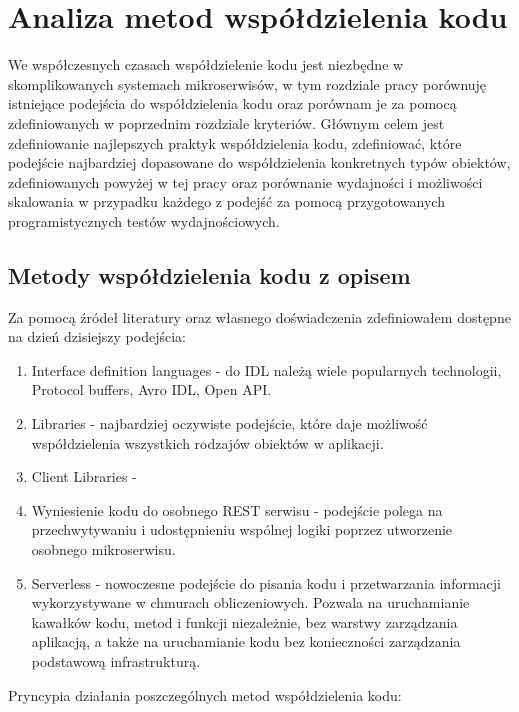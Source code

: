 \documentclass[runningheads,12pt]{llncs}
\begin{document}
\newpage

\section{Analiza metod współdzielenia kodu}

We współczesnych czasach współdzielenie kodu jest niezbędne w skomplikowanych systemach mikroserwisów, w tym rozdziale pracy porównuję istniejące podejścia do współdzielenia kodu oraz porównam je za pomocą zdefiniowanych w poprzednim rozdziale kryteriów. Głównym celem jest zdefiniowanie najlepszych praktyk współdzielenia kodu, zdefiniować, które podejście najbardziej dopasowane do współdzielenia konkretnych typów obiektów, zdefiniowanych powyżej w tej pracy oraz porównanie wydajności i możliwości skalowania w przypadku każdego z podejść za pomocą przygotowanych programistycznych testów wydajnościowych.

\subsection{Metody współdzielenia kodu z opisem}

Za pomocą źródeł literatury oraz własnego doświadczenia zdefiniowałem dostępne na dzień dzisiejszy podejścia:

\begin{enumerate}
    \item Interface definition languages - do IDL należą wiele popularnych technologii, Protocol buffers, Avro IDL, Open API. ~\cite{wiki:interface_description_language}
    \item Libraries - najbardziej oczywiste podejście, które daje możliwość współdzielenia wszystkich rodzajów obiektów w aplikacji.
    \item Client Libraries -
    \item Wyniesienie kodu do osobnego REST serwisu - podejście polega na przechwytywaniu i udostępnieniu wspólnej logiki poprzez utworzenie osobnego mikroserwisu.
    \item Serverless - nowoczesne podejście do pisania kodu i przetwarzania informacji wykorzystywane w chmurach obliczeniowych. Pozwala na uruchamianie kawałków kodu, metod i funkcji niezależnie, bez warstwy zarządzania aplikacją, a także na uruchamianie kodu bez konieczności zarządzania podstawową infrastrukturą. ~\cite{ibm_serverless}
\end{enumerate}

Pryncypia działania poszczególnych metod współdzielenia kodu:
\end{document}

